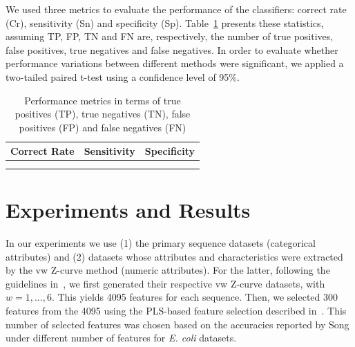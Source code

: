 \documentclass[conference]{IEEEtran}
\begin{document}
We used three metrics to evaluate the performance of the classifiers: correct rate (Cr), sensitivity (Sn) and specificity (Sp). Table~\ref{table:acc} presents these statistics, assuming TP, FP, TN and FN are, respectively, the number of true positives, false positives, true negatives and false negatives. In order to evaluate whether performance variations between different methods were significant, we applied a two-tailed paired t-test using a confidence level of 95\%.

\begin{table}[h]
\caption{Performance metrics in terms of true positives (TP), true negatives (TN), false positives (FP) and false negatives (FN)}
  \begin{center}
    \renewcommand{\arraystretch}{1.2}
    \begin{tabular}{>{\centering\arraybackslash} m{3.0cm} 
                    >{\centering\arraybackslash} m{2.0cm} 
                    >{\centering\arraybackslash} m{2.0cm}}
        \hline
            Correct Rate & Sensitivity & Specificity \\
        \hline
            \multirow{2}{*}{$\dfrac {TP+TN}{TP+FP+TN+FN}$} &
            \multirow{2}{*}{$\dfrac {TP}{TP+FN}$}          &
            \multirow{2}{*}{$\dfrac {TN}{TN+FP}$}          \\
            & & \\
        \hline
    \end{tabular}
  \end{center}
\label{table:acc}
\end{table}

\section{Experiments and Results}
\label{sec:results}

In our experiments we use (1) the primary sequence datasets (categorical attributes) and (2) datasets whose attributes and characteristics were extracted by the vw Z-curve method (numeric attributes). For the latter, following the guidelines in~\cite{song2011a}, we first generated their respective vw Z-curve datasets, with $ w = 1, ..., 6 $. This yields 4095 features for each sequence. Then, we selected 300 features from the 4095 using the PLS-based feature selection described in~\cite{song2011a}. This number of selected features was chosen based on the accuracies reported by Song under different number of features for {\it E. coli } datasets. 
\end{document}

